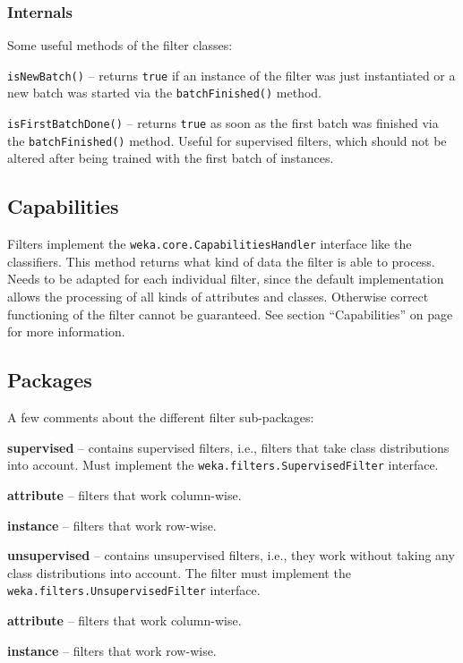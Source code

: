\newpage
\subsubsection{Internals}
Some useful methods of the filter classes:
\begin{tight_itemize}
  \item \texttt{isNewBatch()} -- returns \texttt{true} if an instance of the
filter was just instantiated or a new batch was started via the
\texttt{batchFinished()} method.
  \item \texttt{isFirstBatchDone()} -- returns \texttt{true} as soon as the
first batch was finished via the \texttt{batchFinished()} method. Useful for
supervised filters, which should not be altered after being trained with the
first batch of instances.
\end{tight_itemize}

\subsection{Capabilities}
\label{filter_capabilities}
Filters implement the \texttt{weka.core.CapabilitiesHandler} interface like the
classifiers. This method returns what kind of data the filter is able to
process. Needs to be adapted for each individual filter, since the default
implementation allows the processing of all kinds of attributes and classes.
Otherwise correct functioning of the filter cannot be guaranteed. See section
``Capabilities'' on page \pageref{classifier_capabilities} for more information.

\subsection{Packages}
A few comments about the different filter sub-packages:
\begin{tight_itemize}
  \item \textbf{supervised} -- contains supervised filters, i.e., filters that
take class distributions into account. Must implement the
\texttt{weka.filters.SupervisedFilter} interface.
  \begin{tight_itemize}
	\item \textbf{attribute} -- filters that work column-wise.
	\item \textbf{instance} -- filters that work row-wise.
  \end{tight_itemize}
  \item \textbf{unsupervised} -- contains unsupervised filters, i.e., they work
without taking any class distributions into account. The filter must implement
the \texttt{weka.filters.UnsupervisedFilter} interface.
  \begin{tight_itemize}
	\item \textbf{attribute} -- filters that work column-wise.
	\item \textbf{instance} -- filters that work row-wise.
  \end{tight_itemize}
\end{tight_itemize}

